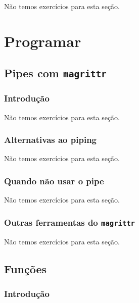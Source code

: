\documentclass[
]{latex/krantz}
\theoremstyle{definition}
\theoremstyle{definition}
\theoremstyle{definition}
\theoremstyle{definition}
\theoremstyle{remark}
\begin{document}
Não temos exercícios para esta seção.

\hypertarget{part-programar}{%
\part{Programar}\label{part-programar}}

\hypertarget{pipes-com-magrittr}{%
\chapter{\texorpdfstring{Pipes com \texttt{magrittr}}{Pipes com magrittr}}\label{pipes-com-magrittr}}

\hypertarget{introduuxe7uxe3o-10}{%
\section{Introdução}\label{introduuxe7uxe3o-10}}

Não temos exercícios para esta seção.

\hypertarget{alternativas-ao-piping}{%
\section{Alternativas ao piping}\label{alternativas-ao-piping}}

Não temos exercícios para esta seção.

\hypertarget{quando-nuxe3o-usar-o-pipe}{%
\section{Quando não usar o pipe}\label{quando-nuxe3o-usar-o-pipe}}

Não temos exercícios para esta seção.

\hypertarget{outras-ferramentas-do-magrittr}{%
\section{\texorpdfstring{Outras ferramentas do \texttt{magrittr}}{Outras ferramentas do magrittr}}\label{outras-ferramentas-do-magrittr}}

Não temos exercícios para esta seção.

\hypertarget{funuxe7uxf5es}{%
\chapter{Funções}\label{funuxe7uxf5es}}

\hypertarget{introduuxe7uxe3o-11}{%
\section{Introdução}\label{introduuxe7uxe3o-11}}
\end{document}
